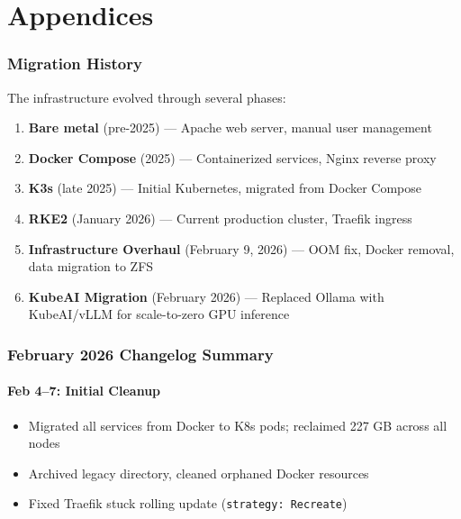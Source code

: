 \documentclass[11pt,a4paper]{article}
\begin{document}
\part*{Appendices}

\section{Migration History}

The infrastructure evolved through several phases:
\begin{enumerate}[nosep]
    \item \textbf{Bare metal} (pre-2025) --- Apache web server, manual user management
    \item \textbf{Docker Compose} (2025) --- Containerized services, Nginx reverse proxy
    \item \textbf{K3s} (late 2025) --- Initial Kubernetes, migrated from Docker Compose
    \item \textbf{RKE2} (January 2026) --- Current production cluster, Traefik ingress
    \item \textbf{Infrastructure Overhaul} (February 9, 2026) --- OOM fix, Docker removal, data migration to ZFS
    \item \textbf{KubeAI Migration} (February 2026) --- Replaced Ollama with KubeAI/vLLM for scale-to-zero GPU inference
\end{enumerate}

\section{February 2026 Changelog Summary}

\subsection{Feb 4--7: Initial Cleanup}
\begin{itemize}[nosep]
    \item Migrated all services from Docker to K8s pods; reclaimed 227 GB across all nodes
    \item Archived legacy directory, cleaned orphaned Docker resources
    \item Fixed Traefik stuck rolling update (\texttt{strategy: Recreate})
\end{itemize}
\end{document}
